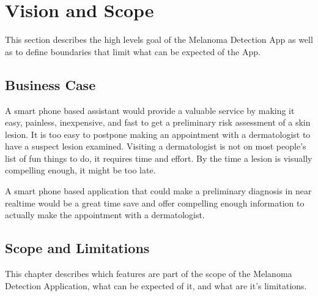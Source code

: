 \section{Vision and Scope}

    This section describes the high levels goal of the Melanoma Detection App as well as to define boundaries that limit what can be expected of the App.

    \subsection{Business Case}

        A smart phone based assistant would provide a valuable service by making it easy, painless, inexpensive, and fast to get a preliminary risk assessment of a skin lesion. It is too easy to postpone making an appointment with a dermatologist to have a suspect lesion examined. Visiting a dermatologist is not on most people’s list of fun things to do, it requires time and effort. By the time a lesion is visually compelling enough, it might be too late.

A smart phone based application that could make a preliminary diagnosis in near realtime would be a great time save and offer compelling enough information to actually make the appointment with a dermatologist.

    \subsection{Scope and Limitations}

    This chapter describes which features are part of the scope of the Melanoma Detection Application, what can be expected of it, and what are it's limitations.

